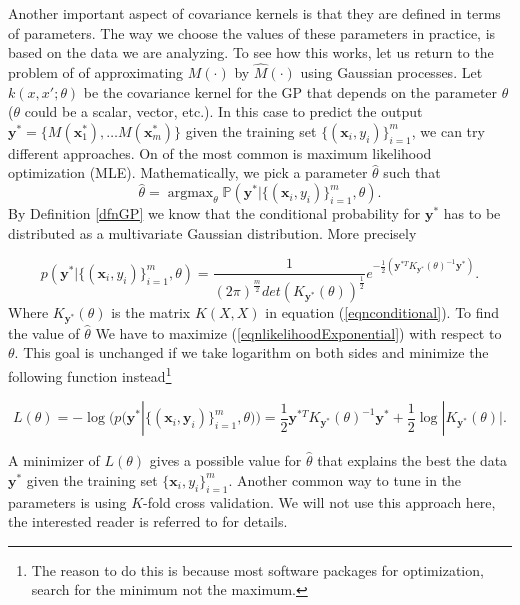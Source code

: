 \documentclass[12pt]{book}
\newcommand{\p}{\mathbb{P}}
\newcommand{\x}{\textbf{x}}
\newcommand{\y}{\textbf{y}}
\newcommand{\argmax}{\mathop{\mathrm{argmax}}}
\begin{document}
Another important aspect of covariance kernels is that they are  defined in terms of parameters. 
The way we choose the values of these parameters in practice, is based on the data
we are analyzing. To see how this works, let us return to the problem of of approximating $M(\cdot)$
by $\widehat{M}(\cdot)$ using Gaussian processes. Let   $k(x,x';\theta)$ be the covariance
kernel for the GP that depends on the parameter $\theta$ 
($\theta$ could be a scalar, vector, etc.). In this case to predict the output
$\y^{*}=\{M(\x_{1}^{*}),\ldots M(\x_{m}^{*})\}$ given the training set $\{(\x_{i},y_{i})\}_{i=1}^{m}$, 
we can try different approaches. On of the most common is maximum likelihood optimization (MLE). 
Mathematically, we pick a parameter $\hat{\theta}$ such that
\begin{equation*}
\hat{\theta}=\argmax_{\theta}\p(\y^{*}|\{(\x_{i},y_{i})\}_{i=1}^{m},\theta).
\end{equation*}
By Definition \ref{dfnGP} we know that the conditional probability for $\y^{*}$ has to be distributed as
a multivariate Gaussian distribution. More precisely

\begin{equation}\label{eqnlikelihoodExponential}
p(\y^{*}|\{(\x_{i},y_{i})\}_{i=1}^{m},\theta)=\frac{1}{(2\pi)^{\frac{m}{2}}det(K_{\y^{*}}(\theta))^{\frac{1}{2}}}
e^{-\frac{1}{2}(\y^{*T}K_{\y^{*}}(\theta)^{-1}\y^{*})}.
\end{equation}
Where $K_{\y^{*}}(\theta)$ is the matrix $K(X,X)$ in equation (\ref{eqnconditional}). 
To find the value of $\hat{\theta}$  We have to maximize (\ref{eqnlikelihoodExponential})
with respect to $\theta$.
This goal is unchanged if we take logarithm on  both sides and minimize the following
function instead\footnote{The reason to do this is because most
software packages for optimization, search for the minimum not the maximum.}


\begin{equation}\label{eqnloglikelihood}
L(\theta)=-\log(p(\y^{*}|\{(\x_{i},\y_{i})\}_{i=1}^{m},\theta))=\frac{1}{2}\y^{*T}K_{\y^{*}}(\theta)^{-1}\y^{*}+
\frac{1}{2}\log|K_{\y^{*}}(\theta)|.
\end{equation}

A minimizer of $L(\theta)$   gives  a possible value for $\hat{\theta}$
that explains the best the data $\y^{*}$ given the training set $\{\x_{i},y_{i}\}_{i=1}^{m}$.  
Another common way to tune in the parameters
is using  $K$-fold cross validation. We will not use this approach here, the interested
reader is referred to \cite{murphy2012machine} for details.
\newline
\end{document}
